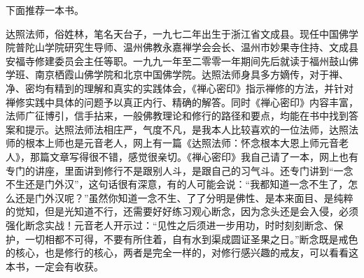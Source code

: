 下面推荐一本书。

\begin{book}
    达照法师，俗姓林，笔名天台子，一九七二年出生于浙江省文成县。现任中国佛学院普陀山学院研究生导师、温州佛教永嘉禅学会会长、温州市妙果寺住持、文成县安福寺修建委员会主任等职。一九九一年至二零零一年期间先后就读于福州鼓山佛学班、南京栖霞山佛学院和北京中国佛学院。达照法师身具多方嫡传，对于禅、净、密均有精到的理解和真实的实践体会，《禅心密印》指示禅修的方法，并针对禅修实践中具体的问题予以真正内行、精确的解答。同时《禅心密印》内容丰富，法师广征博引，信手拈来，一般佛教理论和修行的路径和要点，均能在书中找到答案和提示。达照法师法相庄严，气度不凡，是我本人比较喜欢的一位法师，达照法师的根本上师也是元音老人，网上有一篇《达照法师：怀念根本大恩上师元音老人》，那篇文章写得很不错，感觉很亲切。《禅心密印》我自己请了一本，网上也有专门的讲座，里面讲到修行不是跟别人斗，是跟自己的习气斗。还专门讲到“一念不生还是门外汉”，这句话很有深意，有的人可能会说：“我都知道一念不生了，怎么还是门外汉呢？”虽然你知道一念不生、了了分明是佛性、是本来面目、是纯粹的觉知，但是光知道不行，还需要好好练习观心断念，因为念头还是会入侵，必须强化断念实战！元音老人开示过：“见性之后须进一步用功，时时刻刻断念、保护，一切相都不可得，不要有所住着，自有水到渠成圆证圣果之日。”断念既是戒色的核心，也是修行的核心，两者是完全一样的，对修行感兴趣的戒友，可以看看这本书，一定会有收获。
\end{book}
